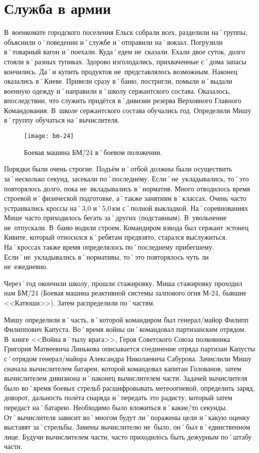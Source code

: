 ﻿\chapter{Служба в армии}
В~военкомате городского поселения Ельск собрали всех, разделили на˚группы, объяснили о˚поведении и˚службе и˚отправили на˚вокзал. Погрузили в˚товарный вагон и˚поехали. Куда˚едем не~сказали. Ехали двое суток, долго стояли в˚разных тупиках. Здорово изголодались, прихваченные с˚дома запасы кончились. Да˚и купить продуктов не~представлялось возможным. Наконец оказались в˚Киеве. Привели сразу в˚баню, постригли, помыли и˚выдали военную одежду и˚направили в˚школу сержантского состава. Оказалось, впоследствии, что служить придётся в˚дивизии резерва Верховного Главного Командования. В~школе сержантского состава обучались год. Определили Мишу в˚группу обучаться на˚вычислителя.

\begin{wrapfigure}{O}{.4\textwidth}
\centering
\texttt{[image: bm-24]}
\caption[Боевая машина БМ\=/24 в˚боевом положении.]{Боевая машина БМ\=/24 в˚боевом положении\footnotemark.}
\label{fig:bm-24}
\end{wrapfigure}

Порядки были очень строгие. Подъём и˚отбой должны были осуществить за˚несколько секунд, засекали по˚последнему. Если˚не~укладывались, то˚это повторялось долго, пока не~вкладывались в˚норматив. Много отводилось время строевой и˚физической подготовке, а˚также занятиям в˚классах. Очень часто устраивались кроссы на˚3,0 и˚5,0\,км с˚полной выкладкой. На˚соревнованиях Мише часто приходилось бегать за˚других (подставным). В~увольнение не~отпускали. В~баню водили строем. Командиром взвода был сержант эстонец Кивите, который относился к˚ребятам предвзято, старался выслужиться. На˚кроссах также время определялось по˚последнему прибегшему. Если˚не~укладывались в˚нормативы, то˚это повторялось чуть ли не~ежедневно. 

Через˚год окончили школу, прошли стажировку. Миша стажировку проходил нам БМ\=/24 (Боевая машина реактивной системы залпового огня М-24, бывшие <<Катюши>>). Затем распределили по˚частям. 

Мишу определили в˚часть, в˚которой командиром был генерал\-/майор Филипп Филиппович Капуста. Во˚время войны он˚командовал партизанским отрядом. В~книге <<Война в˚тылу врага>>, Героя Советского Союза полковника Григория Матвеевича Линькова описывается соединение отряда партизан Капусты с˚отрядом генерал\-/майора Александра Николаевича Сабурова. Зачислили Мишу сначала вычислителем батареи, которой командовал капитан Голованов, затем вычислителем дивизиона и˚наконец вычислителем части. Задачей вычислителя было во˚время боевых стрельб расшифровывать метеоогневой, определить заряд, доворот, дальность полёта снаряда и˚передать это радисту, который затем передаст на˚батарею. Необходимо было вложиться в˚какие\=/то секунды. От˚вычислителя зависит во˚многом будут ли˚поражены цели и˚какую оценку выставят за˚стрельбы. Замены вычислителю не~было, он˚был в˚единственном лице. Будучи вычислителем части, часто приходилось быть дежурным по˚штабу части. 

